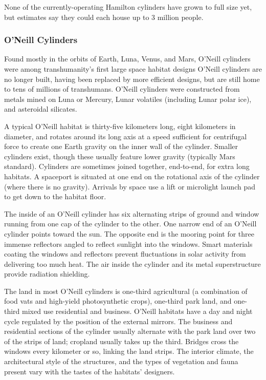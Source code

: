 None of the currently-operating Hamilton cylinders have grown to full size yet, but estimates say they could each house up to 3 million people. 

\subsubsection{O'Neill Cylinders} 

Found mostly in the orbits of Earth, Luna, Venus, and Mars, O'Neill cylinders were among transhumanity's first large space habitat designs O'Neill cylinders are no longer built, having been replaced by more efficient designs, but are still home to tens of millions of transhumans. O'Neill cylinders were constructed from metals mined on Luna or Mercury, Lunar volatiles (including Lunar polar ice), and asteroidal silicates. 

A typical O'Neill habitat is thirty-five kilometers long, eight kilometers in diameter, and rotates around its long axis at a speed sufficient for centrifugal force to create one Earth gravity on the inner wall of the cylinder. Smaller cylinders exist, though these usually feature lower gravity (typically Mars standard). Cylinders are sometimes joined together, end-to-end, for extra long habitats. A spaceport is situated at one end on the rotational axis of the cylinder (where there is no gravity). Arrivals by space use a lift or microlight launch pad to get down to the habitat floor. 



The inside of an O'Neill cylinder has six alternating strips of ground and window running from one cap of the cylinder to the other. One narrow end of an O'Neill cylinder points toward the sun. The opposite end is the mooring point for three immense reflectors angled to reflect sunlight into the windows. Smart materials coating the windows and reflectors prevent fluctuations in solar activity from delivering too much heat. The air inside the cylinder and its metal superstructure provide radiation shielding. 

The land in most O'Neill cylinders is one-third agricultural (a combination of food vats and high-yield photosynthetic crops), one-third park land, and one-third mixed use residential and business. O'Neill habitats have a day and night cycle regulated by the position of the external mirrors. The business and residential sections of the cylinder usually alternate with the park land over two of the strips of land; cropland usually takes up the third. Bridges cross the windows every kilometer or so, linking the land strips. The interior climate, the architectural style of the structures, and the types of vegetation and fauna present vary with the tastes of the habitats' designers. 

